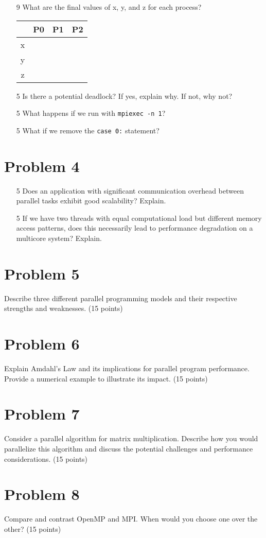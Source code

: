 \documentclass{article}
\begin{document}
\begin{enumerate}
    \item [9] What are the final values of x, y, and z for each process?
    \begin{tabular}{|c|c|c|c|}
    \hline
    & P0 & P1 & P2 \\
    \hline
    x & & & \\
    y & & & \\
    z & & & \\
    \hline
    \end{tabular}
    \item [5]  Is there a potential deadlock? If yes, explain why. If not, why not?
    \item [5] What happens if we run with \texttt{mpiexec -n 1}?
    \item [5]  What if we remove the \texttt{case 0:} statement?
\end{enumerate}

\section*{Problem 4}
\begin{enumerate}
    \item [5] Does an application with significant communication overhead between parallel tasks exhibit good scalability? Explain.
    \item [5] If we have two threads with equal computational load but different memory access patterns, does this necessarily lead to performance degradation on a multicore system? Explain.
\end{enumerate}

\section*{Problem 5}
Describe three different parallel programming models and their respective strengths and weaknesses.  (15 points)

\section*{Problem 6}
Explain Amdahl's Law and its implications for parallel program performance. Provide a numerical example to illustrate its impact. (15 points)

\section*{Problem 7}
Consider a parallel algorithm for matrix multiplication.  Describe how you would parallelize this algorithm and discuss the potential challenges and performance considerations. (15 points)

\section*{Problem 8}
Compare and contrast OpenMP and MPI. When would you choose one over the other? (15 points)
\end{document}
